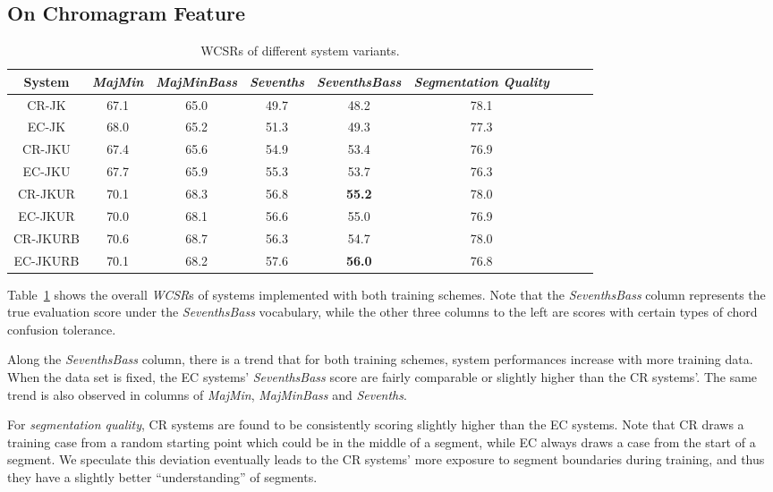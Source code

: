 \subsection{On Chromagram Feature}\label{sec:4-ch}
\label{sec:4-over-ch}
\begin{table}[htb]
	\caption{WCSRs of different system variants.}
	\label{tab:4-overallres}
	\centering
	\scriptsize
	\begin{tabular}{|c|c|c|c|c|c|c|c|c|}\hline
		System & \textit{MajMin} & \textit{MajMinBass} & \textit{Sevenths} & \textbf{\textit{SeventhsBass}} & \textit{Segmentation Quality}  \\ \hline
		CR-JK & 67.1 & 65.0 & 49.7 & 48.2 & 78.1 \\ \hline
		EC-JK & 68.0 & 65.2 & 51.3 & 49.3 & 77.3 \\ \hline
		CR-JKU & 67.4 & 65.6 & 54.9 & 53.4 & 76.9 \\ \hline
		EC-JKU & 67.7 & 65.9 & 55.3 & 53.7 & 76.3 \\ \hline
		CR-JKUR & 70.1 & 68.3 & 56.8 & \textbf{55.2} & 78.0 \\ \hline
		EC-JKUR & 70.0 & 68.1 & 56.6 & 55.0 & 76.9 \\ \hline
		CR-JKURB & 70.6 & 68.7 & 56.3 & 54.7 & 78.0 \\ \hline
		EC-JKURB & 70.1 & 68.2 & 57.6 & \textbf{56.0} & 76.8 \\ \hline
	\end{tabular}
\end{table}
Table~\ref{tab:4-overallres} shows the overall \textit{WCSR}s of systems implemented with both training schemes. Note that the \textit{SeventhsBass} column represents the true evaluation score under the \textit{SeventhsBass} vocabulary, while the other three columns to the left are scores with certain types of chord confusion tolerance.

Along the \textit{SeventhsBass} column, there is a trend that for both training schemes, system performances increase with more training data. When the data set is fixed, the EC systems' \textit{SeventhsBass} score are fairly comparable or slightly higher than the CR systems'. The same trend is also observed in columns of \textit{MajMin}, \textit{MajMinBass} and \textit{Sevenths}.

For \textit{segmentation quality}, CR systems are found to be consistently scoring slightly higher than the EC systems. Note that CR draws a training case from a random starting point which could be in the middle of a segment, while EC always draws a case from the start of a segment. We speculate this deviation eventually leads to the CR systems' more exposure to segment boundaries during training, and thus they have a slightly better ``understanding'' of segments.

